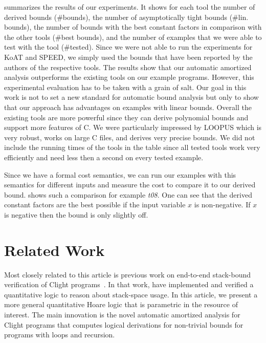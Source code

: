 \documentclass[nocopyrightspace,preprint]{sigplanconf}
\newcommand{\iffull}[2]{\ifx\fullversion\undefined{#2}\else{#1}\fi}
\newcommand{\ifshort}[2]{\ifx\fullversion\undefined{#1}\else{#2}\fi}
\newcommand{\sectskip}[0]{\ifshort{\vspace{-3pt}}{}}
\newcommand{\aftersectskip}[0]{\ifshort{\vspace{-1pt}}{}}
\newcommand{\pref}[1]{\prettyref{#1}}
\begin{document}
\pref{tab:compar} summarizes the results of our experiments.  It shows
for each tool the number of derived bounds (\#bounds), the number of
asymptotically tight bounds (\#lin. bounds), the number of bounds with
the best constant factors in comparison with the other tools (\#best
bounds), and the number of examples that we were able to test with the
tool (\#tested).  Since we were not able to run the experiments for KoAT
and SPEED, we simply used the bounds that have been reported by the
authors of the respective tools.  The results show that our automatic
amortized analysis outperforms the existing tools on our example
programs.  However, this experimental evaluation has to be taken with
a grain of salt.  Our goal in this work is not to set a new standard
for automatic bound analysis but only to show that our approach has
advantages on examples with linear bounds.  Overall the existing tools
are more powerful since they can derive polynomial bounds and support
more features of C.  We were particularly impressed by LOOPUS which is
very robust, works on large C files, and derives very precise bounds.
We did not include the running times of the tools in the table since
all tested tools work very efficiently and need less then a second
on every tested example.

Since we have a formal cost semantics, we can run our examples with
this semantics for different inputs and measure the cost to compare it
to our derived bound.  \pref{fig:3d} shows such a comparison for
example \emph{t08}.  One can see that the derived constant factors are the
best possible if the input variable $x$ is non-negative.  If $x$ is
negative then the bound is only slightly off.

\sectskip
\section{Related Work}
\label{sec:related}
\aftersectskip

Most closely related to this article is \iffull{our}{a} previous work
on end-to-end stack-bound verification of Clight
programs~\cite{veristack14}.  In that work, \iffull{we}{the authors}
have implemented and verified a quantitative logic to reason about
stack-space usage.  In this article, we present a more general
quantitative Hoare logic that is parametric in the resource of
interest.  The main innovation is the novel automatic amortized analysis for
Clight programs that computes logical derivations for non-trivial
bounds for programs with loops and recursion.
\end{document}

